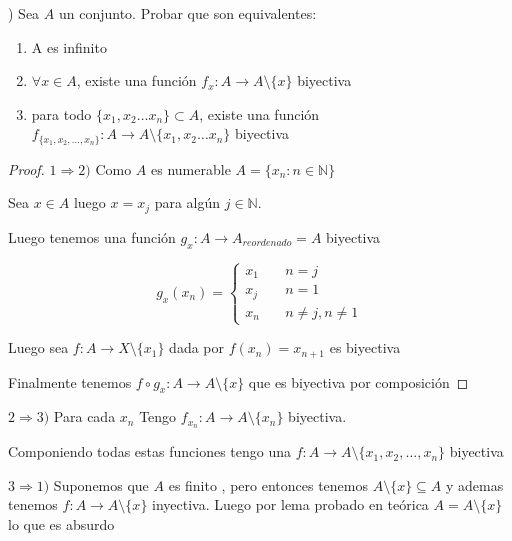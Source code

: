 \documentclass[12pt]{article}
\newcommand{\N}{\mathbb{N}}
\newcommand{\Ra}{\Rightarrow}
\newcommand{\ra}{\rightarrow}
\theoremstyle{definition}
\begin{document}
) Sea $A$ un conjunto. Probar que son equivalentes:
\begin{enumerate}
  \item A es infinito 
  \item $\forall x \in A$, existe una función $f_{x}: A \ra A \setminus \{x\}$ biyectiva
  \item para todo $\{x_{1}, x_{2} \dots x_{n}\} \subset A$, existe una función $f_{\{ x_{1}, x_{2}, \dots , x_{n} \}}: A \ra A \setminus \{x_{1},x_{2} \dots x_{n} \}$ biyectiva
\end{enumerate}

\begin{proof}
   $1 \Ra 2 )$ Como $A$ es numerable $A = \{x_{n} : n \in \N \}$

   Sea $x \in A$ luego $x = x_{j}$ para algún $j \in \N$.
  
   Luego tenemos una función $g_{x}: A \ra A_{reordenado} = A$ biyectiva

$$
g_{x}(x_{n}) = \left\{
        \begin{array}{ll}
	  x_{1} & \quad n = j \\
          x_{j} & \quad n = 1 \\
          x_{n} & \quad n \neq j, n \neq 1
        \end{array}
    \right.
$$

   Luego sea $f: A \ra X \setminus \{x_{1}\}$ dada por $f(x_{n}) = x_{n + 1}$ es biyectiva

   Finalmente tenemos $f \circ g_{x} : A \ra A \setminus \{x\}$ que es biyectiva por composición


\end{proof}

$2 \Ra 3) $ Para cada $x_{n}$ Tengo $f_{x_{n}} : A \ra A \setminus \{x_{n}\}$ biyectiva.

Componiendo todas estas funciones tengo una $f: A \ra A \setminus \{x_{1} , x_{2}, \dots , x_{n}\}$ biyectiva

$3 \Ra 1)$ Suponemos que $A$ es finito , pero entonces tenemos $A \setminus\{x\} \subseteq A$ y ademas tenemos $f: A \ra A \setminus \{x\}$ inyectiva. Luego por lema probado en teórica $A = A \setminus \{x\}$ lo que es absurdo
\end{document}
